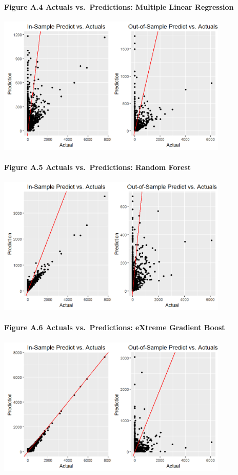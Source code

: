 \documentclass[]{article}
\let\oldparagraph\paragraph
\renewcommand{\paragraph}[1]{\oldparagraph{#1}\mbox{}}
\begin{document}
\newpage

\paragraph{Figure A.4 Actuals vs.~Predictions: Multiple Linear
Regression}\label{figure-a.4-actuals-vs.predictions-multiple-linear-regression}

\includegraphics[height=2.60417in]{images/totamt_m1_lms_sample_pred.png}

\paragraph{Figure A.5 Actuals vs.~Predictions: Random
Forest}\label{figure-a.5-actuals-vs.predictions-random-forest}

\includegraphics[height=2.60417in]{images/totamt_m2_rf_sample_pred.png}

\paragraph{Figure A.6 Actuals vs.~Predictions: eXtreme Gradient
Boost}\label{figure-a.6-actuals-vs.predictions-extreme-gradient-boost}

\includegraphics[height=2.60417in]{images/totamt_m3_xgb_sample_pred.png}
\end{document}
